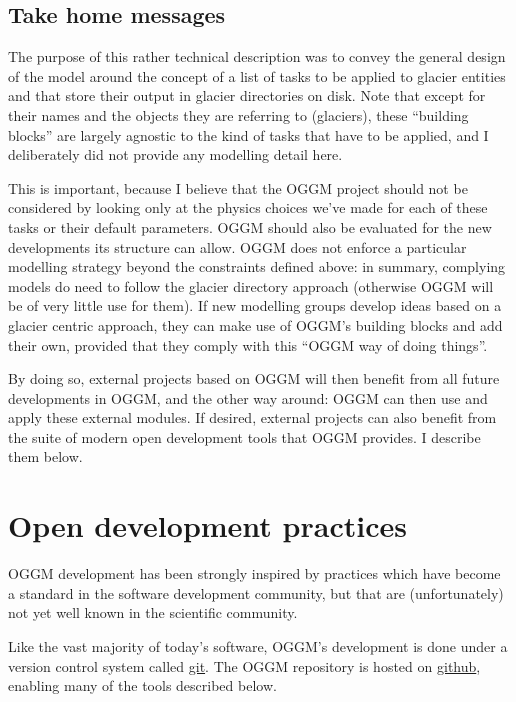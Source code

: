 \subsection{Take home messages}

The purpose of this rather technical description was to convey the general design of the model around the concept of a
list of tasks to be applied to glacier entities and that store their output in glacier directories on disk. Note that
except for their names and the objects they are referring to (glaciers), these “building blocks” are largely
agnostic to the kind of tasks that have to be applied, and I deliberately did not provide any modelling detail here.

This is important, because I believe that the OGGM project should not be considered by looking only at the physics
choices we’ve made for each of these tasks or their default parameters. OGGM should also be evaluated for the new
developments its structure can allow. OGGM does not enforce a particular modelling strategy beyond the constraints
defined above: in summary, complying models do need to follow the glacier directory approach (otherwise OGGM will be of
very little use for them). If new modelling groups develop ideas based on a glacier centric approach, they can make use
of OGGM’s building blocks and add their own, provided that they comply with this “OGGM way of doing things”.

By doing so, external projects based on OGGM will then benefit from all future developments in OGGM, and the other way
around: OGGM can then use and apply these external modules. If desired, external projects can also benefit from the
suite of modern open development tools that OGGM provides. I describe them below.


\section{Open development practices}

OGGM development has been strongly inspired by practices which have become a standard in the software development
community, but that are (unfortunately) not yet well known in the scientific community.

Like the vast majority of today’s software, OGGM’s development is done under a version control system
called \href{https://git-scm.com/}{git}. The OGGM repository is hosted on \href{https://github.com/OGGM/oggm}{github}, enabling
many of the tools described below.


